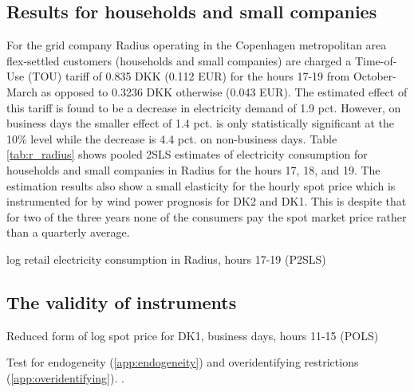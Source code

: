 \subsection{Results for households and small companies}
\label{subsec:r_households}
For the grid company Radius operating in the Copenhagen metropolitan area flex-settled customers (households and small companies) are charged a Time-of-Use (TOU) tariff of 0.835 DKK (0.112 EUR) for the hours 17-19 from October-March as opposed to 0.3236 DKK otherwise (0.043 EUR). The estimated effect of this tariff is found to be a decrease in electricity demand of 1.9 pct. However, on business days the smaller effect of 1.4 pct. is only statistically significant at the 10\% level while the decrease is 4.4 pct. on non-business days. Table \ref{tab:r_radius} shows pooled 2SLS estimates of electricity consumption for households and small companies in Radius for the hours 17, 18, and 19. The estimation results also show a small elasticity for the hourly spot price which is instrumented for by wind power prognosis for DK2 and DK1. This is despite that for two of the three years none of the consumers pay the spot market price rather than a quarterly average.
\begin{table}[H]
  \vspace{-0.0cm}
  \centering
  \caption{log retail electricity consumption in Radius, hours 17-19 (P2SLS)}
  \label{tab:r_radius}
  \footnotesize
        
  \vspace{-0.0cm}
\end{table}


\subsection{The validity of instruments}
\label{subsec:r_validity}

\begin{table}[H]
  \centering
  \caption{Reduced form of log spot price for DK1, business days, hours 11-15 (POLS)}
  \label{tab:reduced_form_price_dk1}
  \footnotesize
        
\end{table}

Test for endogeneity (\ref{app:endogeneity}) and overidentifying restrictions (\ref{app:overidentifying}). \citep{statacorp2017stata}.
\medskip\\


